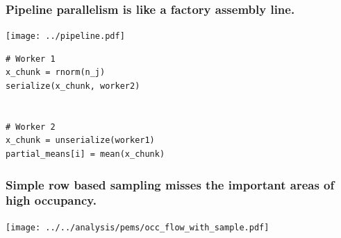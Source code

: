 \documentclass{beamer}
\begin{document}
\begin{frame}[fragile]

    \frametitle{Pipeline parallelism is like a factory assembly line.}

\centerline{\texttt{[image: ../pipeline.pdf]}}

\begin{verbatim}
# Worker 1
x_chunk = rnorm(n_j)
serialize(x_chunk, worker2)


# Worker 2
x_chunk = unserialize(worker1)
partial_means[i] = mean(x_chunk)
\end{verbatim}

\end{frame}
\begin{frame}

    \frametitle{Simple row based sampling misses the important areas of high
    occupancy.}

    \centerline{\texttt{[image: ../../analysis/pems/occ\_flow\_with\_sample.pdf]}}



\end{frame}
\end{document}
